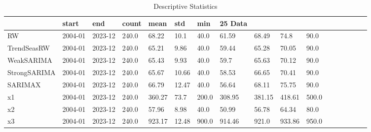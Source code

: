 \begin{table}
\caption{Descriptive Statistics}
\begin{tabular}{lllllllllll}
\toprule
 & start & end & count & mean & std & min & 25%
Data &  &  &  &  &  &  &  &  &  &  \\
\midrule
RW & 2004-01 & 2023-12 & 240.0 & 68.22 & 10.1 & 40.0 & 61.59 & 68.49 & 74.8 & 90.0 \\
TrendSeasRW & 2004-01 & 2023-12 & 240.0 & 65.21 & 9.86 & 40.0 & 59.44 & 65.28 & 70.05 & 90.0 \\
WeakSARIMA & 2004-01 & 2023-12 & 240.0 & 65.43 & 9.93 & 40.0 & 59.7 & 65.63 & 70.12 & 90.0 \\
StrongSARIMA & 2004-01 & 2023-12 & 240.0 & 65.67 & 10.66 & 40.0 & 58.53 & 66.65 & 70.41 & 90.0 \\
SARIMAX & 2004-01 & 2023-12 & 240.0 & 66.79 & 12.47 & 40.0 & 56.64 & 68.11 & 75.75 & 90.0 \\
x1 & 2004-01 & 2023-12 & 240.0 & 360.27 & 73.7 & 200.0 & 308.95 & 381.15 & 418.61 & 500.0 \\
x2 & 2004-01 & 2023-12 & 240.0 & 57.96 & 8.98 & 40.0 & 50.99 & 56.78 & 64.34 & 80.0 \\
x3 & 2004-01 & 2023-12 & 240.0 & 923.17 & 12.48 & 900.0 & 914.46 & 921.0 & 933.86 & 950.0 \\
\bottomrule
\end{tabular}
\end{table}

